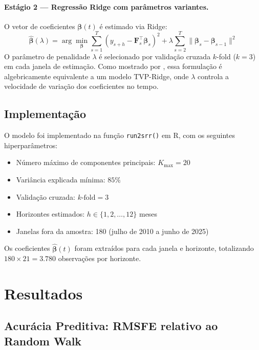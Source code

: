 \documentclass[12pt, a4paper]{article}
\begin{document}
\paragraph{Estágio 2 — Regressão Ridge com parâmetros variantes.}
O vetor de coeficientes $\boldsymbol{\beta}(t)$ é estimado via Ridge:
\[
  \hat{\boldsymbol{\beta}}(\lambda) =
  \arg\min_{\boldsymbol{\beta}}
  \sum_{s=1}^{T} \left(y_{s+h} - \mathbf{F}_s^\top \boldsymbol{\beta}_s
  \right)^2
  + \lambda \sum_{s=2}^{T}
    \|\boldsymbol{\beta}_s - \boldsymbol{\beta}_{s-1}\|^2
\]
O parâmetro de penalidade $\lambda$ é selecionado por validação
cruzada $k$-fold ($k=3$) em cada janela de estimação. Como mostrado
por \citet{Coulombe2021}, essa formulação é algebricamente equivalente
a um modelo TVP-Ridge, onde $\lambda$ controla a velocidade de
variação dos coeficientes no tempo.

\subsection{Implementação}

O modelo foi implementado na função \texttt{run2srr()} em R, com os
seguintes hiperparâmetros:

\begin{itemize}
  \item Número máximo de componentes principais: $K_{\max} = 20$
  \item Variância explicada mínima: $85\%$
  \item Validação cruzada: $k\text{-fold} = 3$
  \item Horizontes estimados: $h \in \{1, 2, \ldots, 12\}$ meses
  \item Janelas fora da amostra: 180 (julho de 2010 a junho de 2025)
\end{itemize}

Os coeficientes $\hat{\boldsymbol{\beta}}(t)$ foram extraídos para
cada janela e horizonte, totalizando $180 \times 21 = 3.780$
observações por horizonte.

\section{Resultados}
\label{sec:resultados}

\subsection{Acurácia Preditiva: RMSFE relativo ao Random Walk}
\end{document}
